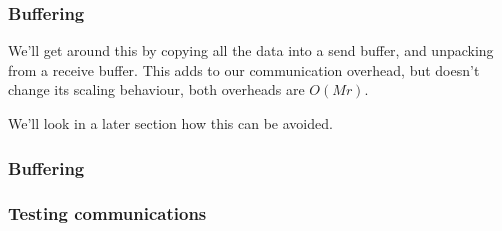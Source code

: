 \subsubsection{Buffering}\label{buffering}

We'll get around this by copying all the data into a send buffer, and
unpacking from a receive buffer. This adds to our communication
overhead, but doesn't change its scaling behaviour, both overheads are
$O(Mr)$.

We'll look in a later section how this can be avoided.

\subsubsection{Buffering}\label{buffering-1}

\begin{Shaded}
\begin{Highlighting}[]

 
  \NormalTok{(} 
    \NormalTok{(} 
    \NormalTok{\}}
  \NormalTok{\}}
\NormalTok{\}}
\end{Highlighting}
\end{Shaded}

\begin{Shaded}
\begin{Highlighting}[]

 
  \NormalTok{(} 
    \NormalTok{(} 
    \NormalTok{\}}
  \NormalTok{\}}
\NormalTok{\}}
\end{Highlighting}
\end{Shaded}

\subsubsection{Testing communications}\label{testing-communications}

